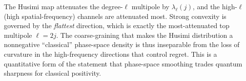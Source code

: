 \begin{remark}[Interpretation]
The Husimi map attenuates the degree-$\ell$ multipole by $\lambda_\ell(j)$,
and the high-$\ell$ (high spatial-frequency) channels are attenuated most.
Strong convexity is governed by the \emph{flattest} direction, which is exactly
the most-attenuated top multipole $\ell=2j$. The coarse-graining that makes the
Husimi distribution a nonnegative ``classical'' phase-space density is thus
inseparable from the loss of curvature in the high-frequency directions that
control regret. This is a quantitative form of the statement that phase-space
smoothing trades quantum sharpness for classical positivity.
\end{remark}
